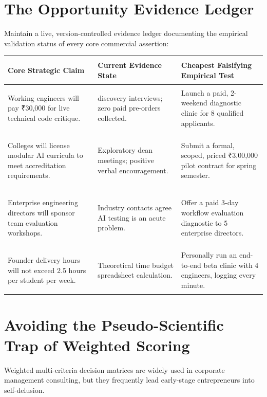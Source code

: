 \section{The Opportunity Evidence Ledger}

Maintain a live, version-controlled evidence ledger documenting the empirical validation status of every core commercial assertion:

\begin{tcolorbox}[
  enhanced,
  colback=BayesSurface!60,
  colframe=BayesBorder,
  boxrule=0.5pt,
  arc=3pt,
  left=3pt,right=3pt,top=3pt,bottom=3pt,
  boxsep=1pt
]
\scriptsize
\begin{tabularx}{\linewidth}{>{\bfseries\raggedright\arraybackslash}p{2.2cm} >{\raggedright\arraybackslash}p{2.3cm} X}
\toprule
\textbf{Core Strategic Claim} & \textbf{Current Evidence State} & \textbf{Cheapest Falsifying Empirical Test} \\
\midrule
Working engineers will pay ₹30,000 for live technical code critique. & 14 discovery interviews; zero paid pre-orders collected. & Launch a paid, 2-weekend diagnostic clinic for 8 qualified applicants. \\
\addlinespace[2pt]
Colleges will license modular AI curricula to meet accreditation requirements. & Exploratory dean meetings; positive verbal encouragement. & Submit a formal, scoped, priced ₹3,00,000 pilot contract for spring semester. \\
\addlinespace[2pt]
Enterprise engineering directors will sponsor team evaluation workshops. & Industry contacts agree AI testing is an acute problem. & Offer a paid 3-day workflow evaluation diagnostic to 5 enterprise directors. \\
\addlinespace[2pt]
Founder delivery hours will not exceed 2.5 hours per student per week. & Theoretical time budget spreadsheet calculation. & Personally run an end-to-end beta clinic with 4 engineers, logging every minute. \\
\bottomrule
\end{tabularx}
\end{tcolorbox}

\section{Avoiding the Pseudo-Scientific Trap of Weighted Scoring}

Weighted multi-criteria decision matrices are widely used in corporate management consulting, but they frequently lead early-stage entrepreneurs into self-delusion.


